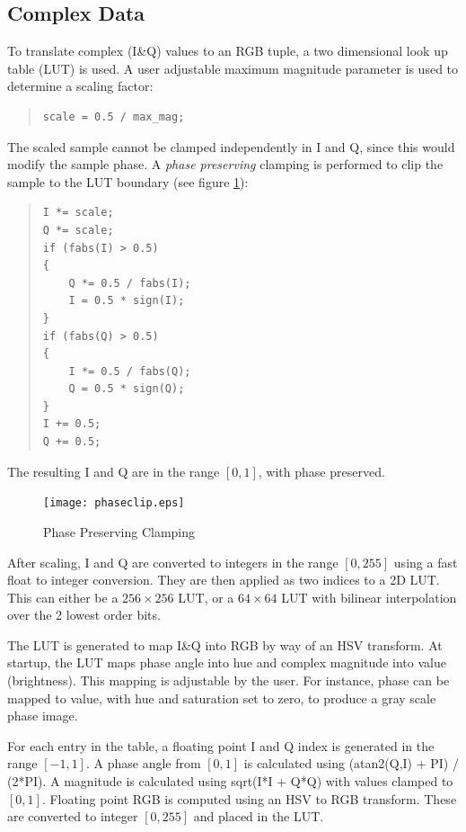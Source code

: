 \documentclass{openevreport}
\begin{document}
\subsection{Complex Data}

To translate complex (I\&Q) values to an RGB tuple, a two dimensional
look up table (LUT) is used.  A user adjustable maximum magnitude
parameter is used to determine a scaling factor:
\begin{quote}\begin{verbatim}
scale = 0.5 / max_mag;
\end{verbatim}\end{quote}
The scaled sample cannot be clamped independently in I and Q, since
this would modify the sample phase.  A \emph{phase preserving}
clamping is performed to clip the sample to the LUT boundary (see
figure \ref{fig:phaseclip}):
\begin{quote}\begin{verbatim}
I *= scale;
Q *= scale;
if (fabs(I) > 0.5)
{
    Q *= 0.5 / fabs(I);
    I = 0.5 * sign(I);
}
if (fabs(Q) > 0.5)
{
    I *= 0.5 / fabs(Q);
    Q = 0.5 * sign(Q);
}
I += 0.5;
Q += 0.5;
\end{verbatim}\end{quote}
The resulting I and Q are in the range $[0,1]$, with phase preserved.

\begin{figure}
\centering
\texttt{[image: phaseclip.eps]}
\caption{Phase Preserving Clamping}
\label{fig:phaseclip}
\end{figure}

After scaling, I and Q are converted to integers in the range
$[0,255]$ using a fast float to integer conversion.  They are then
applied as two indices to a 2D LUT. This can either be a $256\times
256$ LUT, or a $64\times 64$ LUT with bilinear interpolation over the
2 lowest order bits.

The LUT is generated to map I\&Q into RGB by way of an HSV transform.
At startup, the LUT maps phase angle into hue and complex magnitude
into value (brightness).  This mapping is adjustable by the user.  For
instance, phase can be mapped to value, with hue and saturation set to
zero, to produce a gray scale phase image.

For each entry in the table, a floating point I and Q index is
generated in the range $[-1,1]$.  A phase angle from $[0,1]$ is
calculated using (atan2(Q,I) + PI) / (2*PI).  A magnitude is
calculated using sqrt(I*I + Q*Q) with values clamped to $[0,1]$.
Floating point RGB is computed using an HSV to RGB transform.  These
are converted to integer $[0,255]$ and placed in the LUT.
\end{document}
